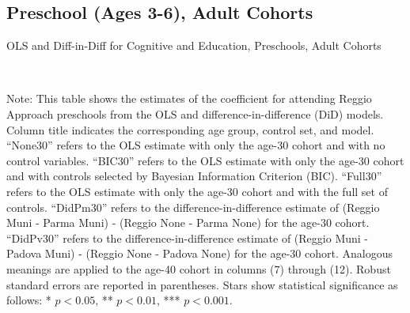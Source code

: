\begin{landscape}
\subsection{Preschool (Ages 3-6), Adult Cohorts}

\begin{table}[H] \caption{OLS and Diff-in-Diff for Cognitive and Education, Preschools, Adult Cohorts} \label{ols-E-reg}
\scalebox{0.80}{}
\vspace{1ex} \\
\footnotesize\raggedright{Note: This table shows the estimates of the coefficient for attending Reggio Approach preschools from the OLS and difference-in-difference (DiD) models. Column title indicates the corresponding age group, control set, and model. ``None30'' refers to the OLS estimate with only the age-30 cohort and with no control variables. ``BIC30'' refers to the OLS estimate with only the age-30 cohort and with controls selected by Bayesian Information Criterion (BIC). ``Full30'' refers to the OLS estimate with only the age-30 cohort and with the full set of controls. ``DidPm30'' refers to the difference-in-difference estimate of (Reggio Muni - Parma Muni) - (Reggio None - Parma None) for the age-30 cohort. ``DidPv30'' refers to the difference-in-difference estimate of (Reggio Muni - Padova Muni) - (Reggio None - Padova None) for the age-30 cohort.  Analogous meanings are applied to the age-40 cohort in columns (7) through (12). Robust standard errors are reported in parentheses. Stars show statistical significance as follows: * $p < 0.05$, ** $p < 0.01$, *** $p < 0.001$.}
\end{table}



\end{landscape}
